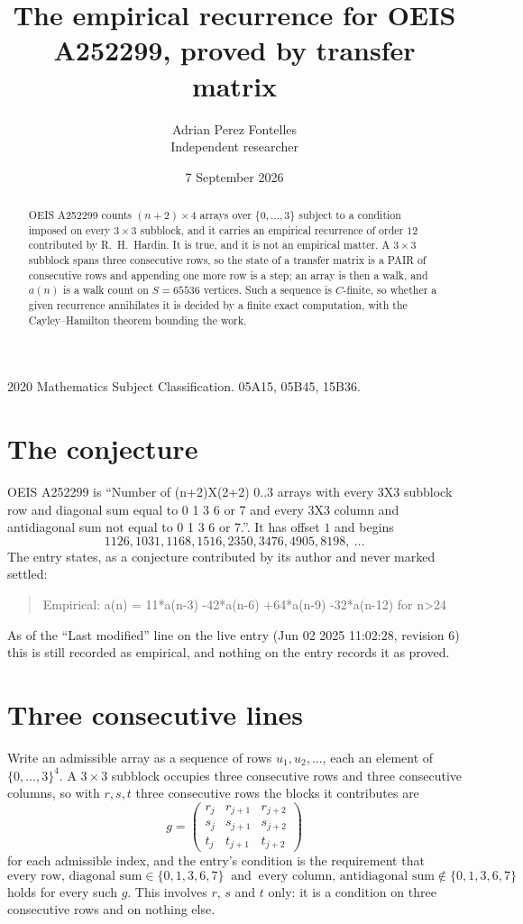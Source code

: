 \documentclass[11pt,a4paper]{article}
\title{The empirical recurrence for OEIS A252299, proved by transfer matrix}
\author{Adrian Perez Fontelles\\ \small Independent researcher}
\date{7 September 2026}
\theoremstyle{plain}
\theoremstyle{definition}
\begin{document}
\maketitle

\begin{abstract}
OEIS A252299 counts $(n+2)\times4$ arrays over $\{0,\dots,3\}$ subject to a condition imposed on
every $3\times3$ subblock, and it carries an empirical recurrence of order $12$
contributed by R.~H.~Hardin. It is true, and it is not an empirical matter. A $3\times3$
subblock spans three consecutive rows, so the state of a transfer matrix is a PAIR of
consecutive rows and appending one more row is a step; an array is then a walk, and
$a(n)$ is a walk count on $S=65536$ vertices. Such a sequence is $C$-finite, so whether a given
recurrence annihilates it is decided by a finite exact computation, with the Cayley--Hamilton
theorem bounding the work.
\end{abstract}

\noindent\small 2020 Mathematics Subject Classification. 05A15, 05B45, 15B36.\normalsize

\section{The conjecture}

OEIS A252299 is ``Number of (n+2)X(2+2) 0..3 arrays with every 3X3 subblock row and diagonal sum equal to 0 1 3 6 or 7 and every 3X3 column and antidiagonal sum not equal to 0 1 3 6 or 7.''. It has offset $1$ and begins
\[
1126, 1031, 1168, 1516, 2350, 3476, 4905, 8198,\ \dots
\]
The entry states, as a conjecture contributed by its author and never marked settled:
\begin{quote}
Empirical: a(n) = 11*a(n-3) -42*a(n-6) +64*a(n-9) -32*a(n-12) for n>24
\end{quote}
As of the ``Last modified'' line on the live entry (Jun 02 2025 11:02:28, revision 6) this is still
recorded as empirical, and nothing on the entry records it as proved.

\section{Three consecutive lines}

Write an admissible array as a sequence of rows $u_1,u_2,\dots$, each an element of
$\{0,\dots,3\}^{4}$. A $3\times3$ subblock occupies three consecutive rows and
three consecutive columns, so with $r,s,t$ three consecutive rows the blocks it
contributes are
\[
g=\begin{pmatrix}r_j&r_{j+1}&r_{j+2}\\ s_j&s_{j+1}&s_{j+2}\\ t_j&t_{j+1}&t_{j+2}\end{pmatrix}
\]
for each admissible index, and the entry's condition is the requirement that
\[
\text{every row, diagonal sum} \in \{0,1,3,6,7\}\ \text{ and }\ \text{every column, antidiagonal sum} \notin \{0,1,3,6,7\}
\]
holds for every such $g$. This involves $r$, $s$ and $t$ only: it is a condition on
three consecutive rows and on nothing else.
\end{document}
